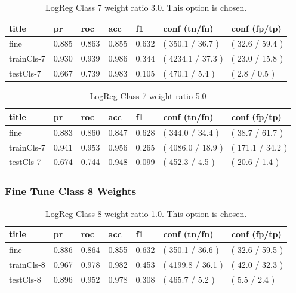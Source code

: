 \documentclass[ms]{nuthesis}
\begin{document}
\FloatBarrier
\begin{table}[H]
\centering
\begin{tabular}{|l||l||l||l||l||l||l|}\toprule
title & pr & roc & acc & f1 & conf (tn/fn) & conf (fp/tp) \\ \midrule
fine & 0.885 & 0.863 & 0.855 & 0.632 & ( 350.1 / 36.7 ) & ( 32.6 / 59.4 ) \\
trainCls-7 & 0.930 & 0.939 & 0.986 & 0.344 & ( 4234.1 / 37.3 ) & ( 23.0 / 15.8 ) \\
testCls-7 & 0.667 & 0.739 & 0.983 & 0.105 & ( 470.1 / 5.4 ) & ( 2.8 / 0.5 ) \\ \bottomrule
\end{tabular}
\caption{LogReg Class 7 weight ratio 3.0. This option is chosen.}
\label{tab:LogRegCls7-Wt3}
\end{table}
\FloatBarrier

\FloatBarrier
\begin{table}[H]
\centering
\begin{tabular}{|l||l||l||l||l||l||l|}\toprule
title & pr & roc & acc & f1 & conf (tn/fn) & conf (fp/tp) \\ \midrule
fine & 0.883 & 0.860 & 0.847 & 0.628 & ( 344.0 / 34.4 ) & ( 38.7 / 61.7 ) \\
trainCls-7 & 0.941 & 0.953 & 0.956 & 0.265 & ( 4086.0 / 18.9 ) & ( 171.1 / 34.2 ) \\
testCls-7 & 0.674 & 0.744 & 0.948 & 0.099 & ( 452.3 / 4.5 ) & ( 20.6 / 1.4 ) \\ \bottomrule
\end{tabular}
\caption{LogReg Class 7 weight ratio 5.0}
\label{tab:LogRegCls7-Wt5}
\end{table}
\FloatBarrier

\subsubsection{Fine Tune Class 8 Weights}
\FloatBarrier
\begin{table}[H]
\centering
\begin{tabular}{|l||l||l||l||l||l||l|}\toprule
title & pr & roc & acc & f1 & conf (tn/fn) & conf (fp/tp) \\ \midrule
fine & 0.886 & 0.864 & 0.855 & 0.632 & ( 350.1 / 36.6 ) & ( 32.6 / 59.5 ) \\
trainCls-8 & 0.967 & 0.978 & 0.982 & 0.453 & ( 4199.8 / 36.1 ) & ( 42.0 / 32.3 ) \\
testCls-8 & 0.896 & 0.952 & 0.978 & 0.308 & ( 465.7 / 5.2 ) & ( 5.5 / 2.4 ) \\ \bottomrule
\end{tabular}
\caption{LogReg Class 8 weight ratio 1.0. This option is chosen.}
\label{tab:LogRegCls8-Wt1}
\end{table}
\FloatBarrier
\end{document}
